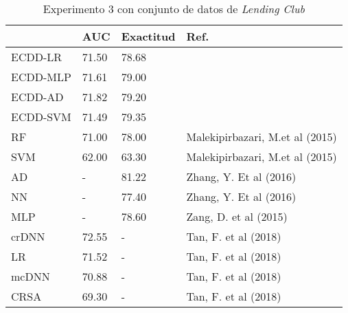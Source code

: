 \begin{table}[htbp]
\centering
\caption{Experimento 3 con conjunto de datos de \textit{Lending Club}}
\label{tab:lc-proc3}
\begin{tabularx}{\textwidth}{|l|Y Y l|}
				\hline
				& AUC			& Exactitud		& Ref.									\\
				\hline
ECDD-LR			& 71.50			& 78.68			&										\\		%
ECDD-MLP		& 71.61			& 79.00			&										\\		%
ECDD-AD			& 71.82			& 79.20			&										\\		%
ECDD-SVM		& 71.49			& 79.35			&										\\		%
				\hline
RF				& 71.00			& 78.00			& Malekipirbazari, M.et al (2015)		\\		%
SVM				& 62.00			& 63.30			& Malekipirbazari, M.et al (2015)		\\		%
AD				& -				& 81.22			& Zhang, Y. Et al (2016)				\\		%
NN				& -				& 77.40			& Zhang, Y. Et al (2016)				\\		%
MLP				& -				& 78.60			& Zang, D. et al (2015)					\\		%
crDNN			& 72.55			& -				& Tan, F. et al (2018)					\\		%
LR				& 71.52			& -				& Tan, F. et al (2018)					\\		%
mcDNN			& 70.88			& -				& Tan, F. et al (2018)					\\		%
CRSA			& 69.30			& -				& Tan, F. et al (2018)					\\		%
				\hline
\end{tabularx}
\par
\end{table}


